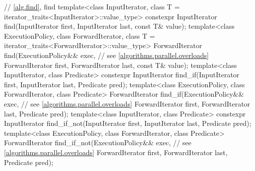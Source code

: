\begin{codeblock}
{  // \ref{alg.find}, find
  template<class InputIterator, class T = iterator_traits<InputIterator>::value_type>
    constexpr InputIterator find(InputIterator first, InputIterator last,
                                 const T& value);
  template<class ExecutionPolicy, class ForwardIterator,
           class T = iterator_traits<ForwardIterator>::value_type>
    ForwardIterator find(ExecutionPolicy&& exec,                // see \ref{algorithms.parallel.overloads}
                         ForwardIterator first, ForwardIterator last,
                         const T& value);
  template<class InputIterator, class Predicate>
    constexpr InputIterator find_if(InputIterator first, InputIterator last,
                                    Predicate pred);
  template<class ExecutionPolicy, class ForwardIterator, class Predicate>
    ForwardIterator find_if(ExecutionPolicy&& exec,             // see \ref{algorithms.parallel.overloads}
                            ForwardIterator first, ForwardIterator last,
                            Predicate pred);
  template<class InputIterator, class Predicate>
    constexpr InputIterator find_if_not(InputIterator first, InputIterator last,
                                        Predicate pred);
  template<class ExecutionPolicy, class ForwardIterator, class Predicate>
    ForwardIterator find_if_not(ExecutionPolicy&& exec,         // see \ref{algorithms.parallel.overloads}
                                ForwardIterator first, ForwardIterator last,
                                Predicate pred);

}
\end{codeblock}
